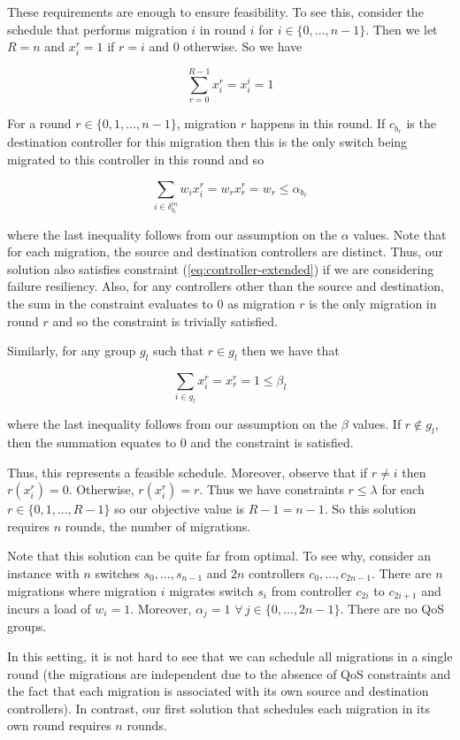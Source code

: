 \documentclass[letterpaper,12pt,titlepage,oneside,final]{article}
\begin{document}
These requirements are enough to ensure feasibility. To see this, consider the schedule that performs migration $i$ in round $i$ for $i \in \{0, ..., n - 1\}$. Then we let $R = n$ and $x^{r}_{i} = 1$ if $r = i$ and 0 otherwise. So we have

$$\sum_{r=0}^{R-1} x^{r}_{i} = x^{i}_{i} = 1$$

For a round $r \in \{0, 1, ..., n - 1\}$, migration $r$ happens in this round. If $c_{b_{r}}$ is the destination controller for this migration then this is the only switch being migrated to this controller in this round and
so

$$\sum_{i \in \delta^{in}_{b_{r}}} w_{i}x^{r}_{i} = w_{r}x^{r}_{r} = w_{r} \leq \alpha_{b_{r}}$$

where the last inequality follows from our assumption on the $\alpha$ values. Note that for each migration, the source and destination controllers are distinct. Thus, our solution also satisfies constraint (\ref{eq:controller-extended}) if we are considering failure resiliency. Also, for any controllers other than the source and destination, the sum in the constraint evaluates to 0 as migration $r$ is the only migration in round $r$ and so the constraint is trivially satisfied.

Similarly, for any group $g_{l}$ such that $r \in g_{l}$ then we have that

$$\sum_{i \in g_{l}} x^{r}_{i} = x^{r}_{r} = 1 \leq \beta_{l}$$

where the last inequality follows from our assumption on the $\beta$ values. If $r \notin g_{l}$, then the summation equates to 0 and the constraint is satisfied. 

Thus, this represents a feasible schedule. Moreover, observe that if $r \neq i$ then $r(x^{r}_{i}) = 0$. Otherwise, $r(x^{r}_{i}) = r$. Thus we have constraints $r \leq \lambda$ for each $r \in \{0, 1, ..., R - 1\}$ so our objective value is $R - 1 = n - 1$. So this solution requires $n$ rounds, the number of migrations.

Note that this solution can be quite far from optimal. To see why, consider an instance with $n$ switches $s_{0}, ..., s_{n-1}$ and $2n$ controllers $c_{0}, ..., c_{2n - 1}$. There are $n$ migrations where migration $i$ migrates switch $s_{i}$ from controller $c_{2i}$ to $c_{2i + 1}$ and incurs a load of $w_{i} = 1$. Moreover, $\alpha_{j} = 1$ $\forall \, j \in \{0, ..., 2n - 1\}$. There are no QoS groups.

In this setting, it is not hard to see that we can schedule all migrations in a single round (the migrations are independent due to the absence of QoS constraints and the fact that each migration is associated with its own source and destination controllers). In contrast, our first solution that schedules each migration in its own round requires $n$ rounds.
\end{document}
